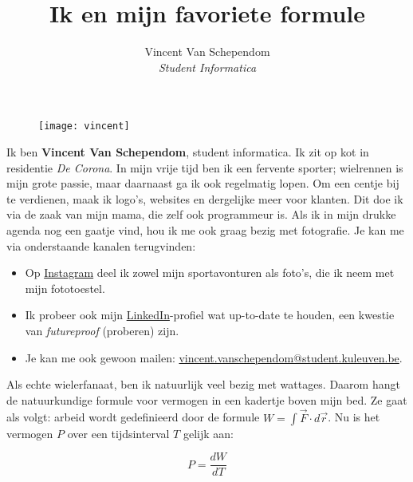 \documentclass{article}
\title{Ik en mijn favoriete formule}
\author{Vincent Van Schependom
	\\ \textit{Student Informatica}}
\date{}
\begin{document}
	
	\maketitle
	
	\begin{figure}[h]
		\centering
		\texttt{[image: vincent]}
	\end{figure}
	
	Ik ben \textbf{Vincent Van Schependom}, student informatica. Ik zit op kot in residentie \textit{De Corona}. In mijn vrije tijd ben ik een fervente sporter; wielrennen is mijn grote passie, maar daarnaast ga ik ook regelmatig lopen. Om een centje bij te verdienen, maak ik logo's, websites en dergelijke meer voor klanten. Dit doe ik via de zaak van mijn mama, die zelf ook programmeur is. Als ik in mijn drukke agenda nog een gaatje vind, hou ik me ook graag bezig met fotografie. Je kan me via onderstaande kanalen terugvinden:
	
	\begin{itemize}
		\item Op \href{https://instagram.com/schependom}{Instagram} deel ik zowel mijn sportavonturen als foto's, die ik neem met mijn fototoestel.
		\item Ik probeer ook mijn \href{https://www.linkedin.com/in/vanschependom/}{LinkedIn}-profiel wat up-to-date te houden, een kwestie van \textit{futureproof} (proberen) zijn.
		\item Je kan me ook gewoon mailen: \href{mailto:vincent.vanschependom@student.kuleuven.be}{vincent.vanschependom@student.kuleuven.be}.
	\end{itemize}
	
	Als echte wielerfanaat, ben ik natuurlijk veel bezig met wattages. Daarom hangt de natuurkundige formule voor vermogen in een kadertje boven mijn bed. Ze gaat als volgt: arbeid wordt gedefinieerd door de formule \(W=\int\vec{F}\cdot d\vec{r}\). Nu is het vermogen \(P\) over een tijdsinterval \(T\) gelijk aan:
	
	\[P=\frac{dW}{dT}\] 
	
\end{document}
